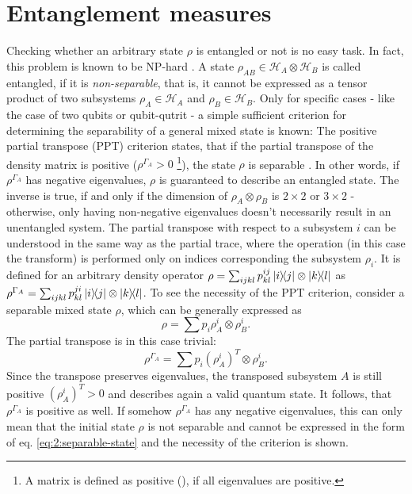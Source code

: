 \section{Entanglement measures}\label{sec:2:entanglement-measures}
Checking whether an arbitrary state $\rho$ is entangled or not is no easy task. In fact, this problem is known to be NP-hard \cite{Gurvits_2003}.
A state $\rho_{AB} \in \mathcal{H}_A\otimes\mathcal{H}_B$ is called entangled, if it is \emph{non-separable}, that is, it cannot be expressed as a tensor product of two subsystems $\rho_A \in \mathcal{H}_A$ and $\rho_B \in \mathcal{H}_B$.
Only for specific cases - like the case of two qubits or qubit-qutrit - a simple sufficient criterion for determining the separability of a general mixed state is known:
The positive partial transpose (PPT) criterion states, that if the partial transpose of the density matrix is positive ($\rho^{\Gamma_A} > 0$ \footnote{A matrix is defined as positive (), if all eigenvalues are positive.}), the state $\rho$ is separable \cite{Horodecki_2009,Plenio_2005a}.
In other words, if $\rho^{\Gamma_A}$ has negative eigenvalues, $\rho$ is guaranteed to describe an entangled state.
The inverse is true, if and only if the dimension of $\rho_A\otimes\rho_B$ is $2\times2$ or $3\times2$ \cite{Horodecki_2009} - otherwise, only having non-negative eigenvalues doesn't necessarily result in an unentangled system.
The partial transpose with respect to a subsystem $i$ can be understood in the same way as the partial trace, where the operation (in this case the transform) is performed only on indices corresponding the subsystem $\rho_i$.
It is defined for an arbitrary density operator $\rho = \sum_{ijkl}p^{ij}_{kl}\ketbra{i}{j}\otimes\ketbra{k}{l}$ as $\rho^{\Gamma_A} = \sum_{ijkl}p^{ji}_{kl}\ketbra{i}{j}\otimes\ketbra{k}{l}$.
To see the necessity of the PPT criterion, consider a separable mixed state $\rho$, which can be generally expressed as 
\begin{equation}\label{eq:2:separable-state}
  \rho = \sum p_i \rho_{A}^i\otimes\rho_{B}^i .
\end{equation}
The partial transpose is in this case trivial:
\begin{equation}
  \rho^{\Gamma_A} = \sum p_i (\rho_{A}^i)^T \otimes \rho_{B}^i .
\end{equation}
Since the transpose preserves eigenvalues, the transposed subsystem $A$ is still positive $(\rho_{A}^i)^T > 0$ and describes again a valid quantum state. It follows, that $\rho^{\Gamma_A}$ is positive as well.
If somehow $\rho^{\Gamma_A}$ has any negative eigenvalues, this can only mean that the initial state $\rho$ is not separable and cannot be expressed in the form of eq. \eqref{eq:2:separable-state} and the necessity of the criterion is shown.

